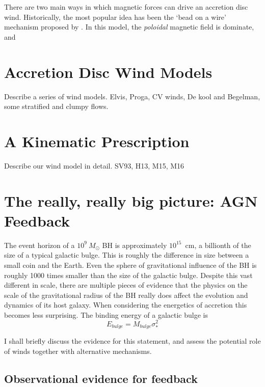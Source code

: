 There are two main ways in which magnetic forces can drive an 
accretion disc wind. Historically, the most popular idea has been the `bead on a wire' mechanism proposed by \citep{blandfordpayne}. In this model,
the {\em poloidal} magnetic field is dominate, and 

\section{Accretion Disc Wind Models}

{
\color{blue}
Describe a series of wind models. 
Elvis, Proga, CV winds, De kool and Begelman, 
some stratified and clumpy flows.
}
\bigskip

\section{A Kinematic Prescription}

{
\color{blue}
Describe our wind model in detail. SV93, H13, M15, M16
}
\bigskip

\section{The really, really big picture: AGN Feedback}

The event horizon of a $10^9~M_\odot$ BH is approximately 
$10^{15}$~cm, a billionth of the size of a typical galactic bulge. This is 
roughly the difference in size between a small coin and the 
Earth. Even the sphere of gravitational influence of the BH is roughly 
1000 times smaller than the size of the galactic bulge.
Despite this vast different in scale, there are multiple
pieces of evidence that the physics on the scale of the gravitational
radius of the BH really does affect the evolution and dynamics of its host galaxy.
When considering the energetics of accretion this becomes less surprising.
The binding energy of a galactic bulge is 
\begin{equation}
E_{bulge} = M_{bulge} \sigma_*^2
\end{equation}



I shall briefly discuss the evidence for this statement, and 
assess the potential role of winds together with alternative mechanisms.

\subsection{Observational evidence for feedback}

